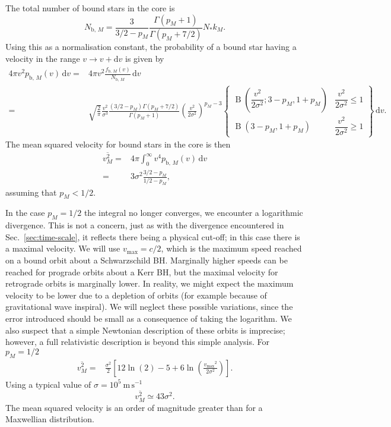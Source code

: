 \documentclass[useAMS,usedcolumn,usegraphicx,usenatbib]{mn2e}
\newcommand{\secref}[1]{Sec.~\ref{sec:#1}}
\DeclareMathOperator{\Beta}{B}
\newcommand{\units}[1]{\ensuremath{~\mathrm{#1}}}
\newcommand{\sub}[1]{\ensuremath{_\mathrm{#1}}}
\newcommand{\dd}{\ensuremath{\mathrm{d}}}
\newcommand{\intd}[4]{\ensuremath{\displaystyle \int_{#1}^{#2}{#3}\,\dd{#4}}}
\begin{document}
\begin{onecolumn}
The total number of bound stars in the core is
\begin{equation}
N_{\mathrm{b},\,M} = \frac{3}{3/2 - p_M}\frac{\Gamma(p_M + 1)}{\Gamma(p_M + 7/2)}N_\ast k_M.
\end{equation}
Using this as a normalisation constant, the probability of a bound star having a velocity in the range $v \rightarrow v + \dd v$ is given by
\begin{align}
4\pi v^2 p_{\mathrm{b},\,M}(v) \,\dd v = {} & 4\pi v^2 \frac{f_{\mathrm{b},\,M}(v)}{N_{\mathrm{b},\,M}} \,\dd v \\
 = {} & \sqrt{\frac{2}{\pi}} \frac{v^2}{\sigma^3} \frac{\left(3/2 - p_M\right)\Gamma(p_M + 7/2)}{\Gamma(p_M + 1)} \left(\frac{v^2}{2\sigma^2}\right)^{p_M - 3}\left\{\begin{array}{lr}
\Beta\left(\dfrac{v^2}{2\sigma^2}; 3 - p_M, 1 + p_M\right) & \dfrac{v^2}{2\sigma^2} \leq 1 \\
\Beta\left(3 - p_M, 1 + p_M\right) & \dfrac{v^2}{2\sigma^2} \geq 1\end{array}\right\}\,\dd v.
\end{align}
The mean squared velocity for bound stars in the core is then
\begin{align}
\overline{v^2_{M}} = {} & 4\pi\intd{0}{\infty}{v^4 p_{\mathrm{b},\,M}(v)}{v} \\
 = {} & 3\sigma^2\frac{3/2 - p_M}{1/2 - p_M},
\end{align}
assuming that $p_M < 1/2$.

In the case $p_M = 1/2$ the integral no longer converges, we encounter a logarithmic divergence. This is not a concern, just as with the divergence encountered in \secref{time-scale}, it reflects there being a physical cut-off; in this case there is a maximal velocity. We will use $v\sub{max} = c/2$, which is the maximum speed reached on a bound orbit about a Schwarzschild BH. Marginally higher speeds can be reached for prograde orbits about a Kerr BH, but the maximal velocity for retrograde orbits is marginally lower. In reality, we might expect the maximum velocity to be lower due to a depletion of orbits (for example because of gravitational wave inspiral). We will neglect these possible variations, since the error introduced should be small as a consequence of taking the logarithm. We also suspect that a simple Newtonian description of these orbits is imprecise; however, a full relativistic description is beyond this simple analysis. For $p_M = 1/2$
\begin{align}
\overline{v^2_{M}} = {} & \frac{\sigma^2}{2}\left[12\ln(2) - 5 + 6 \ln\left(\frac{v\sub{max}^2}{2\sigma^2}\right)\right].
\end{align}
Using a typical value of $\sigma = 10^5\units{m\,s^{-1}}$
\begin{equation}
\overline{v^2_{M}} \simeq 43\sigma^2.
\end{equation}
The mean squared velocity is an order of magnitude greater than for a Maxwellian distribution.


\end{onecolumn}
\end{document}
